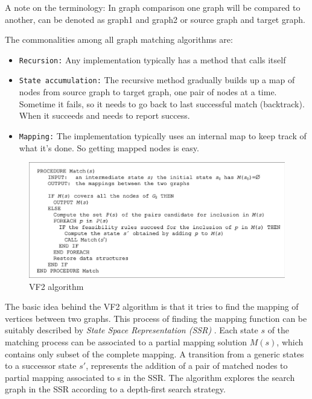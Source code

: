 A note on the terminology: In graph comparison one graph will be compared to another, can be denoted as graph1 and graph2 or source graph and target graph. 

The commonalities among all graph matching algorithms are:\cite{ric}
\begin{itemize}
\item \texttt{Recursion:} Any implementation typically has a method that calls itself

\item\texttt{State accumulation:} The recursive method gradually builds up a map of nodes from source graph to target graph, one pair of nodes at a time. Sometime it fails, so it needs to go back to last successful match (backtrack). When it succeeds and needs to report success.

\item \texttt{Mapping:} The implementation typically uses an internal map to keep track of what it's done. So getting mapped nodes is easy.
\end{itemize}
 
\begin{figure}
\centerline{
\includegraphics[width=1.0\columnwidth]{figures/vf2_image.png}
}
\caption{VF2 algorithm }
\label{vf2}
\end{figure}

The basic idea behind the VF2 algorithm is that it tries to find the mapping of vertices between two graphs. 
This process of finding the mapping function can be suitably
described by \textit{State Space Representation (SSR)} \cite{vf2}.
Each state $s$ of the matching process can be associated to a partial mapping solution $M(s)$, which contains only subset of the complete mapping. A transition from a generic states to a successor state $s'$, represents the addition of a pair of matched nodes to partial mapping associated to s in the SSR. The algorithm explores the search graph in the SSR according to a depth-first search strategy. 

